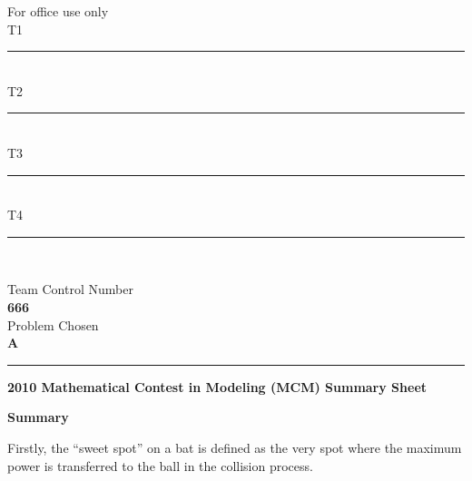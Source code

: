 \documentclass[12pt]{article}
\begin{document}

\thispagestyle{empty}
\begin{minipage}{0.3\textwidth}
\begin{flushleft}
For office use only\\
   T1\ \rule{3cm}{0.5pt}\\
   T2\ \rule{3cm}{0.5pt}\\
   T3\ \rule{3cm}{0.5pt}\\
   T4\ \rule{3cm}{0.5pt}\\
\end{flushleft}
\end{minipage}\hspace{\fill}
\begin{minipage}{0.3\textwidth}
\centering
Team Control Number\\[5pt]
\fontsize{36pt}{\baselineskip}\selectfont  \textbf{666} \normalsize\\[10pt]
Problem Chosen\\[5pt]
\fontsize{18pt}{\baselineskip}\selectfont \textbf{A }\normalsize\\
\end{minipage}\hfill
\begin{minipage}{0.35\textwidth}
\begin{flushright}
\end{flushright}
\end{minipage}\vspace*{10pt}
\rule{\textwidth}{0.5pt}

\begin{center}
  \textbf{2010 Mathematical Contest in Modeling (MCM) Summary Sheet}
\end{center}
\noindent
{\Large \textbf{Summary}}
\vspace{7pt}

Firstly, the ``sweet spot'' on a bat is defined as
the very spot where the maximum power is transferred to the ball in the collision process.
\end{document}
